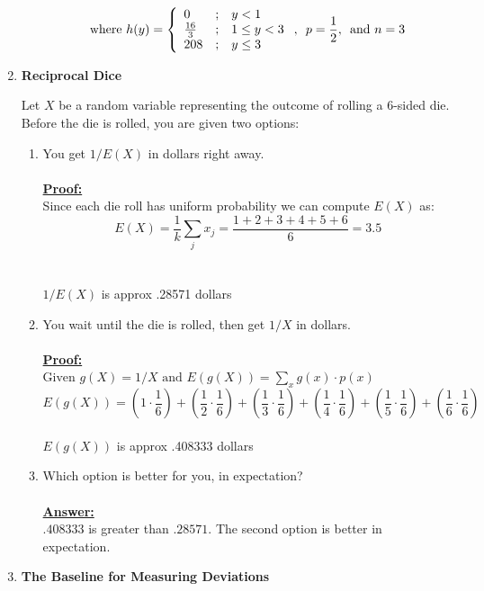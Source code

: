 \documentclass[12pt,a4paper]{article}
\numberwithin{equation}{subsection}
\begin{document}
\begin{enumerate}
\begin{enumerate}
$$\text{where } h(y) = \left\{\begin{array}{{lcl}} 0 &;& y < 1 \\  \frac{16}{3} &;& 1 \leq y < 3 \\  208 &;& y \leq 3 \end{array} \right. ,\enskip p=\frac{1}{2}, \enskip \text{and } n=3$$

\end{enumerate}

\item \textbf{Reciprocal Dice}

Let $X$ be a random variable representing the outcome of rolling a 6-sided die.  Before the die is rolled, you are given two options:

\begin{enumerate}
\item You get $1/E(X)$ in dollars right away.
\\
\\
\textbf{\underline{Proof:}}
\\
Since each die roll has uniform probability we can compute $E(X)$ as:
\\
$$E(X) = \frac{1}{k}{\sum_j x_j} = \frac{1+2+3+4+5+6}{6} = 3.5$$
\\
\\
$1/E(X)$ is approx .28571 dollars

\item You wait until the die is rolled, then get $1/X$ in dollars.
\\
\\
\textbf{\underline{Proof:}}
\\
$\text{Given } g(X) = 1/X \text{ and } E(g(X)) = \sum_x g(x) \cdot p(x)$
\\
$$E(g(X)) = (1 \cdot \frac{1}{6}) + (\frac{1}{2} \cdot \frac{1}{6}) + (\frac{1}{3} \cdot \frac{1}{6}) + (\frac{1}{4} \cdot \frac{1}{6}) + (\frac{1}{5} \cdot \frac{1}{6}) + (\frac{1}{6} \cdot \frac{1}{6})$$
\\
$E(g(X))$ is approx .408333 dollars

\item Which option is better for you, in expectation?
\\
\\
\textbf{\underline{Answer:}}
\\
$.408333$ is greater than $.28571$. The second option is better in expectation.

\end{enumerate}

\item \textbf{The Baseline for Measuring Deviations}


\end{enumerate}
\end{document}
